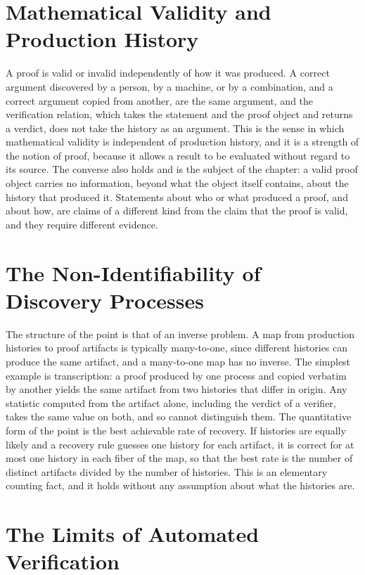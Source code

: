 \documentclass[11pt,letterpaper]{report}
\theoremstyle{plain}
\theoremstyle{definition}
\theoremstyle{remark}
\begin{document}
\section{Mathematical Validity and Production History}

A proof is valid or invalid independently of how it was produced. A correct argument discovered by a person, by a machine, or by a combination, and a correct argument copied from another, are the same argument, and the verification relation, which takes the statement and the proof object and returns a verdict, does not take the history as an argument. This is the sense in which mathematical validity is independent of production history, and it is a strength of the notion of proof, because it allows a result to be evaluated without regard to its source. The converse also holds and is the subject of the chapter: a valid proof object carries no information, beyond what the object itself contains, about the history that produced it. Statements about who or what produced a proof, and about how, are claims of a different kind from the claim that the proof is valid, and they require different evidence.

\section{The Non-Identifiability of Discovery Processes}

The structure of the point is that of an inverse problem. A map from production histories to proof artifacts is typically many-to-one, since different histories can produce the same artifact, and a many-to-one map has no inverse. The simplest example is transcription: a proof produced by one process and copied verbatim by another yields the same artifact from two histories that differ in origin. Any statistic computed from the artifact alone, including the verdict of a verifier, takes the same value on both, and so cannot distinguish them. The quantitative form of the point is the best achievable rate of recovery. If histories are equally likely and a recovery rule guesses one history for each artifact, it is correct for at most one history in each fiber of the map, so that the best rate is the number of distinct artifacts divided by the number of histories. This is an elementary counting fact, and it holds without any assumption about what the histories are.

\section{The Limits of Automated Verification}
\end{document}
